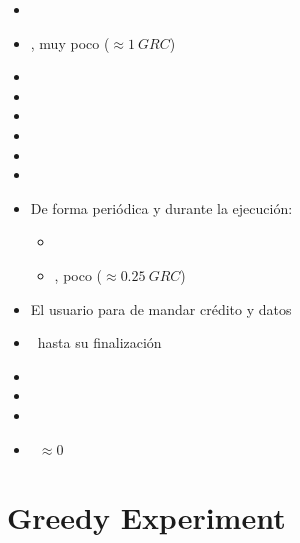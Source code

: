 \documentclass[preprint,3p]{elsarticle}
\begin{document}
\begin{itemize}
	\setlength\itemsep{0em}
	\item \UserNoCredit
	\item \UserSendsCredit, muy poco ($\approx 1~GRC$)
	\item \UserSendsSomeTasks
	\item \ContainerUp
	\item \AppStart
	\item \ServerlessAdapts
	\item \AccountingConsumes
	\item \AppRuns
	\item De forma periódica y durante la ejecución:
	\begin{itemize}
		\item \UserSendsSomeTasks
		\item \UserSendsCredit, poco ($ \approx 0.25~GRC$)
	\end{itemize}
	\item El usuario para de mandar crédito y datos
	\item \AppRuns~hasta su finalización
	\item \ServerlessDown
	\item \AccountingIdle
	\item \ContainerTimeout
	\item \AccountingCredit~$\approx 0$
\end{itemize}

\newpage
\section{Greedy Experiment}
\end{document}

